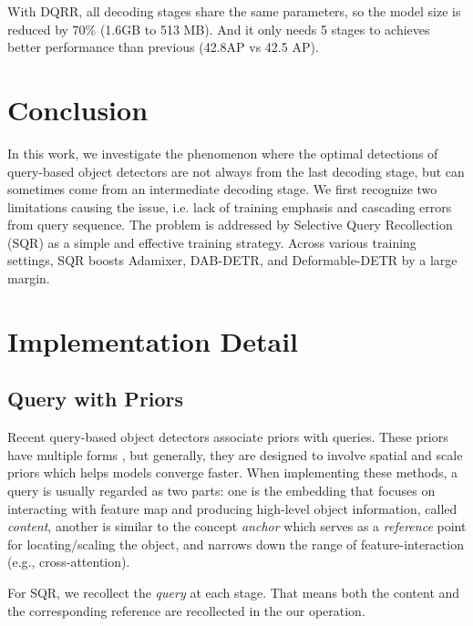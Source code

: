 \documentclass[10pt,twocolumn,letterpaper]{article}
\begin{document}
With DQRR, all decoding stages share the same parameters, so the model size is reduced by 70\% (1.6GB to 513 MB). And it only needs 5 stages to achieves better performance than previous (42.8AP vs 42.5 AP).

\section{Conclusion}
\label{sec:conclusion}
In this work, we investigate the phenomenon where the optimal detections of query-based object detectors are not always from the last decoding stage, but can sometimes come from an intermediate decoding stage. We first recognize two limitations causing the issue, i.e. lack of training emphasis and cascading errors from query sequence. The problem is addressed by Selective Query Recollection (SQR) as a simple and effective training strategy.
Across various training settings, SQR boosts Adamixer, DAB-DETR, and Deformable-DETR by a large margin.


{\small


}

\newcommand{\beginsupplement}{\setcounter{table}{0}
        \renewcommand{\thetable}{S\arabic{table}}\setcounter{figure}{0}
        \renewcommand{\thefigure}{S\arabic{figure}}}

\appendix
\beginsupplement
\section{Implementation Detail}
\subsection{Query with Priors}
Recent query-based object detectors associate priors with queries.  These priors have multiple forms \cite{Gao2022AdaMixerAF,Liu2022DABDETRDA, Wang2022AnchorDQ, Meng2021ConditionalDF}, but generally, they are designed to involve spatial and scale priors which helps models converge faster. When implementing these methods, a query is usually regarded as two parts: one is the embedding that focuses on interacting with feature map and producing high-level object information, called \emph{content}, another is similar to the concept \emph{anchor}\cite{Ren2015FasterRT} which serves as a \emph{reference} point for locating/scaling the object, and narrows down the range of feature-interaction (e.g., cross-attention). 

For SQR, we recollect the \emph{query} at each stage. That means both the content and the corresponding reference are recollected in the our operation. 
\end{document}
